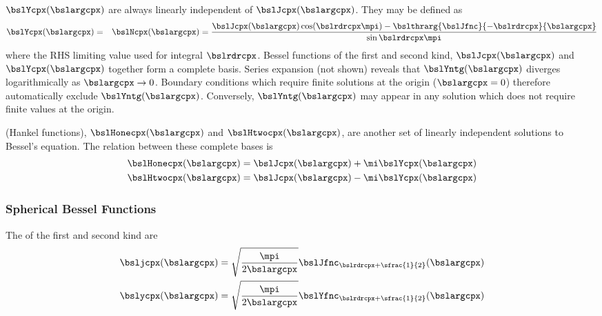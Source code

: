\documentclass[12pt]{article}
\begin{document}
 $\bslYcpx(\bslargcpx)$
are always linearly independent of $\bslJcpx(\bslargcpx)$.
They may be defined as
\begin{eqnarray}
\bslYcpx(\bslargcpx) & = & 
\bslNcpx(\bslargcpx) =  
\frac{\bslJcpx(\bslargcpx)\cos(\bslrdrcpx\mpi)-\bslthrarg{\bslJfnc}{-\bslrdrcpx}{\bslargcpx}}{\sin\bslrdrcpx\mpi}
\label{eqn:bsl_Y_dfn}
\end{eqnarray}
where the RHS limiting value used for integral $\bslrdrcpx$. 
Bessel functions of the first and second kind, $\bslJcpx(\bslargcpx)$ 
and $\bslYcpx(\bslargcpx)$ together form a complete basis.
Series expansion (not shown) reveals that $\bslYntg(\bslargcpx)$
diverges logarithmically as $\bslargcpx \to 0$.
Boundary conditions which require finite solutions at the origin 
($\bslargcpx = 0$) therefore automatically exclude
$\bslYntg(\bslargcpx)$. 
Conversely, $\bslYntg(\bslargcpx)$ may appear in any solution
which does not require finite values at the origin.

 (Hankel functions),
$\bslHonecpx(\bslargcpx)$ and $\bslHtwocpx(\bslargcpx)$, are another
set of linearly independent solutions to Bessel's equation.
The relation between these complete bases is
\begin{subequations}
\begin{align}
\bslHonecpx(\bslargcpx) & = \bslJcpx(\bslargcpx) + \mi\bslYcpx(\bslargcpx) \\
\bslHtwocpx(\bslargcpx) & = \bslJcpx(\bslargcpx) - \mi\bslYcpx(\bslargcpx)
\label{eqn:bsl_hnk_dfn}
\end{align}
\end{subequations}

\subsubsection[Spherical Bessel Functions]{Spherical Bessel Functions}\label{sxn:bsl_sph}
The  of the first and second kind
are 
\begin{subequations}
\begin{align}
\bsljcpx(\bslargcpx) & =
\sqrt{\frac{\mpi}{2\bslargcpx}}\bslJfnc_{\bslrdrcpx+\sfrac{1}{2}}(\bslargcpx) \\
\bslycpx(\bslargcpx) & =
\sqrt{\frac{\mpi}{2\bslargcpx}}\bslYfnc_{\bslrdrcpx+\sfrac{1}{2}}(\bslargcpx) 
\label{eqn:bsl_sph_dfn}
\end{align}
\end{subequations}
\end{document}
